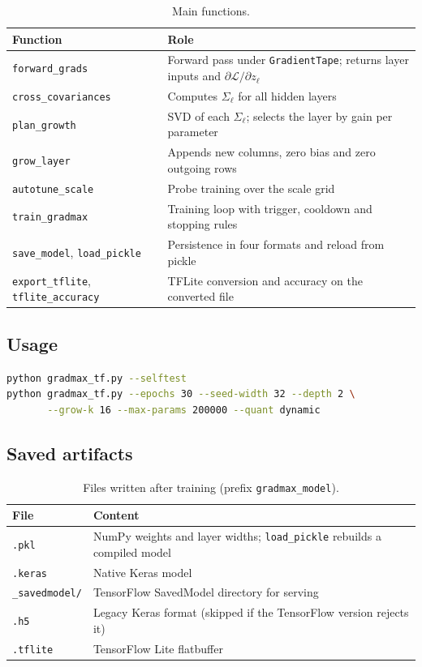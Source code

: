 \documentclass[11pt,a4paper]{article}
\newcommand{\code}[1]{\texttt{#1}}
\begin{document}
\begin{table}[h]
\centering
\caption{Main functions.}
\begin{tabular}{@{}lp{9.5cm}@{}}
\toprule
Function & Role \\
\midrule
\code{forward\_grads} & Forward pass under \code{GradientTape}; returns layer inputs and $\partial\mathcal{L}/\partial z_\ell$ \\
\code{cross\_covariances} & Computes $\Sigma_\ell$ for all hidden layers \\
\code{plan\_growth} & SVD of each $\Sigma_\ell$; selects the layer by gain per parameter \\
\code{grow\_layer} & Appends new columns, zero bias and zero outgoing rows \\
\code{autotune\_scale} & Probe training over the scale grid \\
\code{train\_gradmax} & Training loop with trigger, cooldown and stopping rules \\
\code{save\_model}, \code{load\_pickle} & Persistence in four formats and reload from pickle \\
\code{export\_tflite}, \code{tflite\_accuracy} & TFLite conversion and accuracy on the converted file \\
\bottomrule
\end{tabular}
\end{table}

\subsection{Usage}
\begin{lstlisting}[language=bash]
python gradmax_tf.py --selftest
python gradmax_tf.py --epochs 30 --seed-width 32 --depth 2 \
       --grow-k 16 --max-params 200000 --quant dynamic
\end{lstlisting}

\subsection{Saved artifacts}
\begin{table}[h]
\centering
\caption{Files written after training (prefix \code{gradmax\_model}).}
\begin{tabular}{@{}ll@{}}
\toprule
File & Content \\
\midrule
\code{.pkl} & NumPy weights and layer widths; \code{load\_pickle} rebuilds a compiled model \\
\code{.keras} & Native Keras model \\
\code{\_savedmodel/} & TensorFlow SavedModel directory for serving \\
\code{.h5} & Legacy Keras format (skipped if the TensorFlow version rejects it) \\
\code{.tflite} & TensorFlow Lite flatbuffer \\
\bottomrule
\end{tabular}
\end{table}
\end{document}
